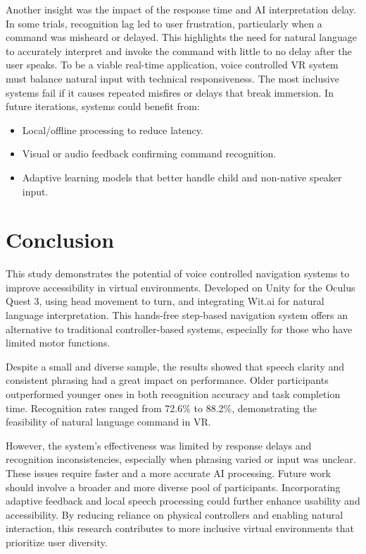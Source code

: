 \documentclass[manuscript, screen, review]{acmart}
\begin{document}
Another insight was the impact of the response time and AI interpretation delay. In some trials, recognition lag led to user frustration, particularly when a command was misheard or delayed. This highlights the need for natural language to accurately interpret and invoke the command with little to no delay after the user speaks. To be a viable real-time application, voice controlled VR system must balance natural input with technical responsiveness. The most inclusive systems fail if it causes repeated misfires or delays that break immersion. In future iterations, systems could benefit from: 

\begin{itemize}
    \item Local/offline processing to reduce latency.
    \item Visual or audio feedback confirming command recognition.
    \item Adaptive learning models that better handle child and non-native speaker input.
    
\end{itemize}
\section{Conclusion}
This study demonstrates the potential of voice controlled navigation systems to improve accessibility in virtual environments. Developed on Unity for the Oculus Quest 3, using head movement to turn, and integrating Wit.ai for natural language interpretation. This hands-free step-based navigation system offers an alternative to traditional controller-based systems, especially for those who have limited motor functions.


Despite a small and diverse sample, the results showed that speech clarity and consistent phrasing had a great impact on performance. Older participants outperformed younger ones in both recognition accuracy and task completion time. Recognition rates ranged from 72.6\% to 88.2\%, demonstrating the feasibility of natural language command in VR.

However, the system's effectiveness was limited by response delays and recognition inconsistencies, especially when phrasing varied or input was unclear. These issues require faster and a more accurate AI processing. Future work should involve a broader and more diverse pool of participants. Incorporating adaptive feedback and local speech processing could further enhance usability and accessibility. By reducing reliance on physical controllers and enabling natural interaction, this research contributes to more inclusive virtual environments that prioritize user diversity. 





\appendix
\end{document}
